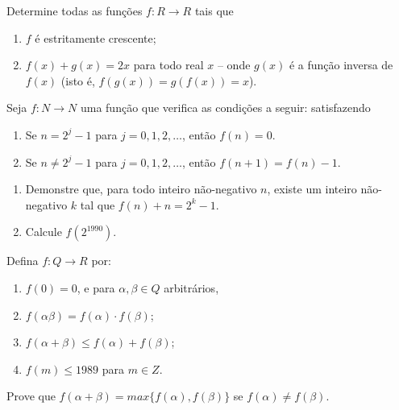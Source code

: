 \begin{questao}
  Determine todas as funções $f: R \rightarrow R$ tais que

  \begin{enumerate}

  \item $f$ é estritamente crescente;

  \item $f(x)+g(x)=2x$ para todo real $x$ -- onde $g(x)$ é a função inversa de
    $f(x)$ (isto é, $f(g(x)) = g(f(x)) = x$).
  \end{enumerate}
\end{questao}

\begin{questao}
  Seja $f: N \rightarrow N$ uma função que verifica as condições a seguir:
  satisfazendo

  \begin{enumerate}

  \item Se $n=2^j-1$ para $j=0,1,2,\ldots$, então $f(n)=0$.

  \item Se $n \not= 2^j-1$ para $j=0,1,2,\ldots$, então $f(n+1) = f(n)-1$.
  \end{enumerate}

  \begin{enumerate}

  \item Demonstre que, para todo inteiro não-negativo $n$, existe um inteiro
    não-negativo $k$ tal que $f(n)+n=2^k-1$.

  \item Calcule $f(2^{1990})$.
  \end{enumerate}

\end{questao}

\begin{questao}
  Defina $f: Q \rightarrow R$ por:

  \begin{enumerate}

  \item $f(0)=0$, e para $\alpha,\beta \in Q$ arbitrários,

  \item $f(\alpha \beta) = f(\alpha) \cdot f(\beta)$;

  \item $f(\alpha + \beta) \leq f(\alpha) + f(\beta)$;

  \item $f(m) \leq 1989$ para $m \in Z$.
  \end{enumerate}

  Prove que $f(\alpha + \beta) = max\{f(\alpha), f(\beta)\}$ se $f(\alpha) \not
  = f(\beta)$.
\end{questao}

